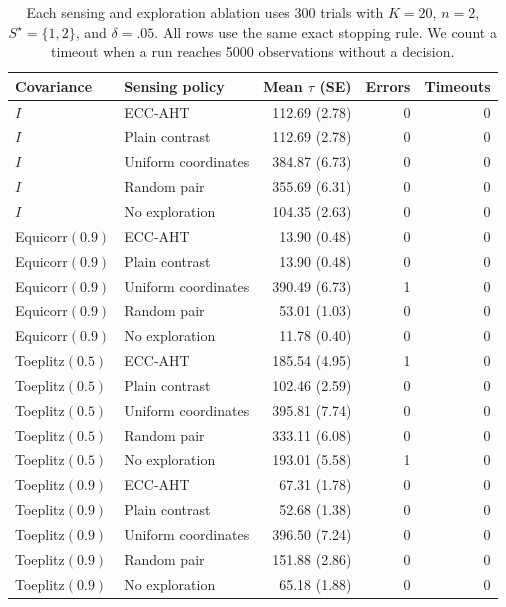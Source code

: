 \begin{table}[t]
\centering\footnotesize
\caption{Each sensing and exploration ablation uses 300 trials with $K=20$, $n=2$, $S^\star=\{1,2\}$, and $\delta=.05$. All rows use the same exact stopping rule. We count a timeout when a run reaches 5000 observations without a decision.}
\label{tab:algorithm1-ablation}
\begin{tabular}{llrrr}
\toprule
Covariance & Sensing policy & Mean $\tau$ (SE) & Errors & Timeouts\\
\midrule
$I$ & ECC-AHT & 112.69 (2.78) & 0 & 0\\
$I$ & Plain contrast & 112.69 (2.78) & 0 & 0\\
$I$ & Uniform coordinates & 384.87 (6.73) & 0 & 0\\
$I$ & Random pair & 355.69 (6.31) & 0 & 0\\
$I$ & No exploration & 104.35 (2.63) & 0 & 0\\
Equicorr$(0.9)$ & ECC-AHT & 13.90 (0.48) & 0 & 0\\
Equicorr$(0.9)$ & Plain contrast & 13.90 (0.48) & 0 & 0\\
Equicorr$(0.9)$ & Uniform coordinates & 390.49 (6.73) & 1 & 0\\
Equicorr$(0.9)$ & Random pair & 53.01 (1.03) & 0 & 0\\
Equicorr$(0.9)$ & No exploration & 11.78 (0.40) & 0 & 0\\
Toeplitz$(0.5)$ & ECC-AHT & 185.54 (4.95) & 1 & 0\\
Toeplitz$(0.5)$ & Plain contrast & 102.46 (2.59) & 0 & 0\\
Toeplitz$(0.5)$ & Uniform coordinates & 395.81 (7.74) & 0 & 0\\
Toeplitz$(0.5)$ & Random pair & 333.11 (6.08) & 0 & 0\\
Toeplitz$(0.5)$ & No exploration & 193.01 (5.58) & 1 & 0\\
Toeplitz$(0.9)$ & ECC-AHT & 67.31 (1.78) & 0 & 0\\
Toeplitz$(0.9)$ & Plain contrast & 52.68 (1.38) & 0 & 0\\
Toeplitz$(0.9)$ & Uniform coordinates & 396.50 (7.24) & 0 & 0\\
Toeplitz$(0.9)$ & Random pair & 151.88 (2.86) & 0 & 0\\
Toeplitz$(0.9)$ & No exploration & 65.18 (1.88) & 0 & 0\\
\bottomrule
\end{tabular}
\end{table}
